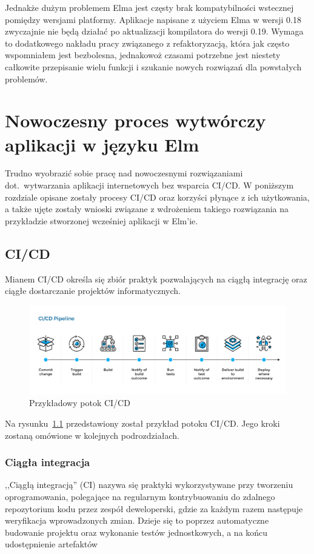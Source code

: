 \documentclass[twoside,a4paper]{report}
\begin{document}
Jednakże dużym problemem Elma jest częsty brak kompatybilności wstecznej pomiędzy wersjami platformy.
Aplikacje napisane z użyciem Elma w wersji 0.18 zwyczajnie nie będą działać po aktualizacji kompilatora do wersji 0.19.
Wymaga to dodatkowego nakładu pracy związanego z refaktoryzacją, która jak często wspomniałem jest bezbolesna, jednakowoż czasami potrzebne jest niestety całkowite przepisanie wielu funkcji i szukanie nowych rozwiązań dla powstałych problemów.


\chapter{Nowoczesny proces wytwórczy aplikacji w języku Elm}
Trudno wyobrazić sobie pracę nad nowoczesnymi rozwiązaniami dot.~wytwarzania aplikacji internetowych bez wsparcia CI/CD\@.
W poniższym rozdziale opisane zostały procesy CI/CD oraz korzyści płynące z ich użytkowania, a także ujęte zostały wnioski związane z wdrożeniem takiego rozwiązania na przykładzie stworzonej wcześniej aplikacji w Elm'ie.

\section{CI/CD}
Mianem CI/CD określa się zbiór praktyk pozwalających na ciągłą integrację oraz ciągłe dostarczanie projektów informatycznych.
\begin{figure}[H]
    \centering
    \includegraphics[width=1\textwidth]{img/cicd_pipeline.png}
    \caption{Przykładowy potok CI/CD}\label{fig:cicd_pipeline}
\end{figure}
Na rysunku~\ref{fig:cicd_pipeline} przedstawiony został przykład potoku CI/CD\@.
Jego kroki zostaną omówione w kolejnych podrozdziałach.

\subsection{Ciągła integracja}
,,Ciągłą integracją'' (CI) nazywa się praktyki wykorzystywane przy tworzeniu oprogramowania, polegające na regularnym kontrybuowaniu do zdalnego repozytorium kodu przez zespół deweloperski, gdzie za każdym razem następuje weryfikacja wprowadzonych zmian.
Dzieje się to poprzez automatyczne budowanie projektu oraz wykonanie testów jednostkowych, a na końcu udostępnienie artefaktów
\end{document}
